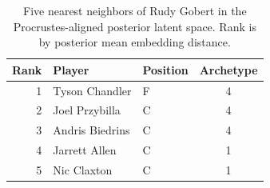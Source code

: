 \begin{table}[htbp]
  \centering\small
  \begin{tabular}{rllc}
    \toprule
    Rank & Player & Position & Archetype \\
    \midrule
    1 & Tyson Chandler & F & 4 \\
    2 & Joel Przybilla & C & 4 \\
    3 & Andris Biedrins & C & 4 \\
    4 & Jarrett Allen & C & 1 \\
    5 & Nic Claxton & C & 1 \\
    \bottomrule
  \end{tabular}
  \caption{Five nearest neighbors of Rudy Gobert in the Procrustes-aligned posterior latent space. Rank is by posterior mean embedding distance.}
  \label{tab:Rudy_Gobert_neighbors}
\end{table}

